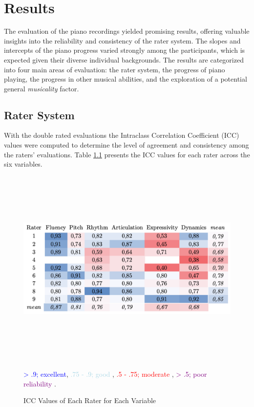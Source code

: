 \chapter{Results}
\label{cap:Results}
The evaluation of the piano recordings yielded promising results, offering valuable insights into the reliability and consistency of the rater system. The slopes and intercepts of the piano progress varied strongly among the participants, which is expected given their diverse individual backgrounds. The results are categorized into four main areas of evaluation: the rater system, the progress of piano playing, the progress in other musical abilities, and the exploration of a potential general \textit{musicality} factor.


\section{Rater System}

With the double rated evaluations the Intraclass Correlation Coefficient (ICC) values were computed to determine the level of agreement and consistency among the raters' evaluations. Table \ref{fig:icc} presents the ICC values for each rater across the six variables.

\begin{figure}[h]
	\centering
	\includegraphics[width=12cm,height=10cm,keepaspectratio]{ICC}
	\caption{ICC Values of Each Rater for Each Variable}
	\label{fig:icc}
	\textcolor{blue}{> .9; excellent}, \textcolor{lightblue}{.75 - .9; good }, \textcolor{red}{.5 - .75; moderate }, \textcolor{purple}{> .5; poor reliability} \cite{Koo2016}.
\end{figure}

